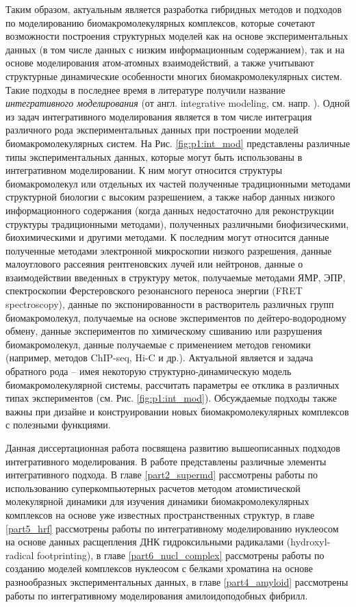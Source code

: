 Таким образом, актуальным является разработка гибридных методов и подходов по моделированию биомакромолекулярных комплексов, которые сочетают возможности построения структурных моделей как на основе экспериментальных данных (в том числе данных с низким информационным содержанием), так и на основе моделирования атом-атомных взаимодействий, а также учитывают структурные динамические особенности многих биомакромолекулярных систем. Такие подходы в последнее время в литературе получили название \textit{интегративного моделирования} (от англ. integrative modeling, см. напр. \cite{braitbard_integrative_2019}). Одной из задач интегративного моделирования является в том числе интеграция различного рода экспериментальных данных при построении моделей биомакромолекулярных систем. На Рис. 
\ref{fig:p1:int_mod} представлены различные типы экспериментальных данных, которые могут быть использованы в интегративном моделировании. К ним  могут относится структуры биомакромолекул или отдельных их частей полученные традиционными методами структурной биологии с высоким разрешением, а также набор данных низкого информационного содержания (когда данных недостаточно для реконструкции структуры традиционными методами), полученных различными биофизическими, биохимическими и другими методами. К последним могут относится данные полученные методами электронной микроскопии низкого разрешения, данные малоуглового рассеяния рентгеновских лучей или нейтронов, данные о взаимодействии введенных в структуру меток, получаемые методами ЯМР, ЭПР, спектроскопии Ферстеровского резонансного переноса энергии (FRET spectroscopy), данные по экспонированности в растворитель различных групп биомакромолекул, получаемые на основе экспериментов по дейтеро-водородному обмену, данные экспериментов по химическому сшиванию или разрушения биомакромолекул, данные получаемые с применением методов геномики (например, методов ChIP-seq, Hi-C и др.). Актуальной является и задача обратного рода -- имея некоторую структурно-динамическую модель биомакромолекулярной системы, рассчитать параметры ее отклика в различных типах экспериментов (см. Рис. \ref{fig:p1:int_mod}). Обсуждаемые подходы также важны при дизайне и конструировании новых биомакромолекулярных комплексов с полезными функциями.

Данная диссертационная работа посвящена развитию вышеописанных подходов интегративного моделирования. В работе представлены различные элементы интегративного подхода. В главе \ref{part2_supermd} рассмотрены работы по использованию суперкомпьютерных расчетов методом атомистической молекулярной динамики для изучения динамики биомакромолекулярных комплексов на основе уже известных пространственных структур, в главе \ref{part5_hrf} рассмотрены работы по интегративному моделированию нуклеосом на основе данных расщепления ДНК гидроксильными радикалами (hydroxyl-radical footprinting), в главе \ref{part6_nucl_complex} рассмотрены работы по созданию моделей комплексов нуклеосом с белками хроматина на основе разнообразных экспериментальных данных, в главе \ref{part4_amyloid} рассмотрены работы по интегративному моделирования амилоидоподобных фибрилл.


